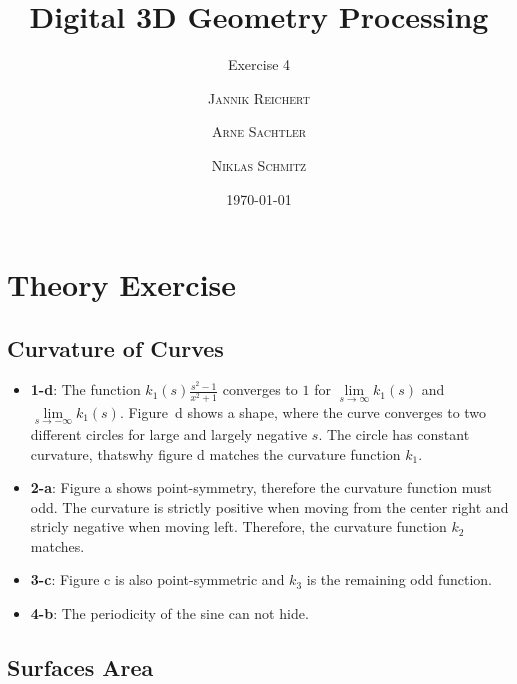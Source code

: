 \documentclass{scrartcl}
\title{Digital 3D Geometry Processing}
\subtitle{Exercise 4}
\author{\textsc{Jannik Reichert} \and \textsc{Arne Sachtler} \and \textsc{Niklas Schmitz}}
\date{\today}
\begin{document}
\maketitle

\section{Theory Exercise}

\subsection{Curvature of Curves}

\begin{itemize}
	\item \textbf{1-d}: The function $k_1(s) \frac{s^2 -1}{x^2+1}$ converges to $1$ for $\lim\limits_{s \rightarrow \infty} k_1(s)$ and $\lim\limits_{s \rightarrow -\infty} k_1(s)$. Figure~d shows a shape, where the curve converges to two different circles for large and largely negative $s$. The circle has constant curvature, thatswhy figure d matches the curvature function $k_1$.
	\item \textbf{2-a}: Figure a shows point-symmetry, therefore the curvature function must odd. The curvature is strictly positive when moving from the center right and stricly negative when moving left. Therefore, the curvature function $k_2$ matches.
	\item \textbf{3-c}: Figure c is also point-symmetric and $k_3$ is the remaining odd function.
	\item \textbf{4-b}: The periodicity of the sine can not hide.
\end{itemize}

\subsection{Surfaces Area}
\end{document}
